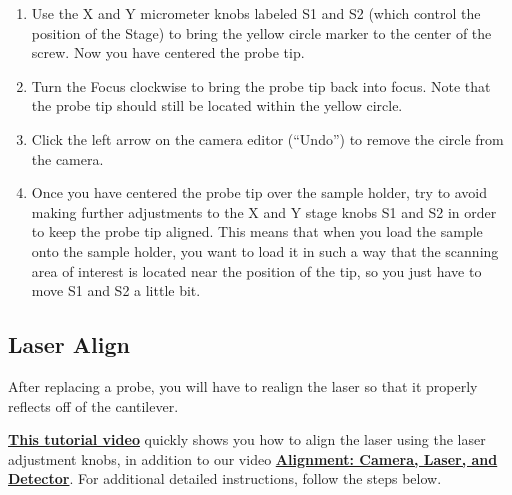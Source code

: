 \documentclass{../lab}
\begin{document}
\begin{enumerate}
    \item Use the X and Y micrometer knobs labeled S1 and S2 (which control the position of the Stage) to bring the yellow circle marker to the center of the screw.  Now you have centered the probe tip.
    
    \item Turn the Focus clockwise to bring the probe tip back into focus.  Note that the probe tip should still be located within the yellow circle.
    
    \item Click the left arrow on the camera editor (``Undo'') to remove the circle from the camera.
    
    \item Once you have centered the probe tip over the sample holder, try to avoid making further adjustments to the X and Y stage knobs S1 and S2 in order to keep the probe tip aligned.  This means that when you load the sample onto the sample holder, you want to load it in such a way that the scanning area of interest is located near the position of the tip, so you just have to move S1 and S2 a little bit.
\end{enumerate}

\subsection{Laser Align}
\label{subsec:LaserAlign}

After replacing a probe, you will have to realign the laser so that it properly reflects off of the cantilever.

\href{http://experimentationlab.berkeley.edu/sites/default/files/AFMImages/4.0\%20Laser\%20Align\%28V1.0\%29.wmv}{\textbf{This tutorial video}} quickly shows you how to align the laser using the laser adjustment knobs, in addition to our video  \href{http://experimentationlab.berkeley.edu/sites/default/files/alignment\_final2.mp4}{\textbf{Alignment: Camera, Laser, and Detector}}.  For additional detailed instructions, follow the steps below.
\end{document}
